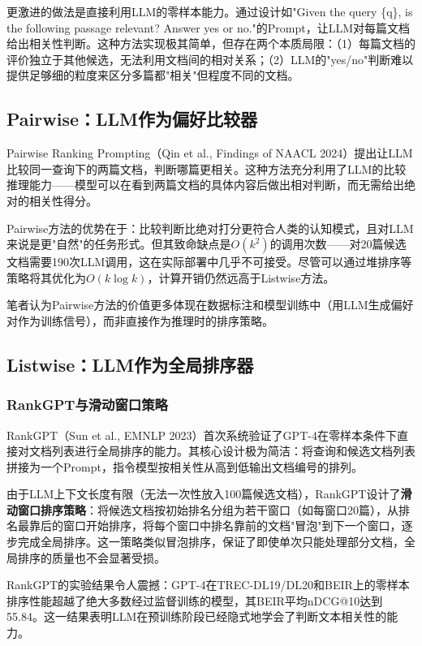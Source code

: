\documentclass[12pt,a4paper]{article}
\begin{document}
更激进的做法是直接利用LLM的零样本能力。通过设计如"Given the query \{q\}, is the following passage relevant? Answer yes or no."的Prompt，让LLM对每篇文档给出相关性判断。这种方法实现极其简单，但存在两个本质局限：（1）每篇文档的评价独立于其他候选，无法利用文档间的相对关系；（2）LLM的"yes/no"判断难以提供足够细的粒度来区分多篇都"相关"但程度不同的文档。

\subsection{Pairwise：LLM作为偏好比较器}

Pairwise Ranking Prompting\cite{qin2024large}（Qin et al., Findings of NAACL 2024）提出让LLM比较同一查询下的两篇文档，判断哪篇更相关。这种方法充分利用了LLM的比较推理能力——模型可以在看到两篇文档的具体内容后做出相对判断，而无需给出绝对的相关性得分。

Pairwise方法的优势在于：比较判断比绝对打分更符合人类的认知模式，且对LLM来说是更"自然"的任务形式。但其致命缺点是$O(k^2)$的调用次数——对20篇候选文档需要190次LLM调用，这在实际部署中几乎不可接受。尽管可以通过堆排序等策略将其优化为$O(k\log k)$，计算开销仍然远高于Listwise方法。

笔者认为Pairwise方法的价值更多体现在数据标注和模型训练中（用LLM生成偏好对作为训练信号），而非直接作为推理时的排序策略。

\subsection{Listwise：LLM作为全局排序器}

\subsubsection{RankGPT与滑动窗口策略}

RankGPT\cite{sun2023chatgpt}（Sun et al., EMNLP 2023）首次系统验证了GPT-4在零样本条件下直接对文档列表进行全局排序的能力。其核心设计极为简洁：将查询和候选文档列表拼接为一个Prompt，指令模型按相关性从高到低输出文档编号的排列。

由于LLM上下文长度有限（无法一次性放入100篇候选文档），RankGPT设计了\textbf{滑动窗口排序策略}：将候选文档按初始排名分组为若干窗口（如每窗口20篇），从排名最靠后的窗口开始排序，将每个窗口中排名靠前的文档"冒泡"到下一个窗口，逐步完成全局排序。这一策略类似冒泡排序，保证了即使单次只能处理部分文档，全局排序的质量也不会显著受损。

RankGPT的实验结果令人震撼：GPT-4在TREC-DL19/DL20和BEIR上的零样本排序性能超越了绝大多数经过监督训练的模型，其BEIR平均nDCG@10达到55.84。这一结果表明LLM在预训练阶段已经隐式地学会了判断文本相关性的能力。
\end{document}
